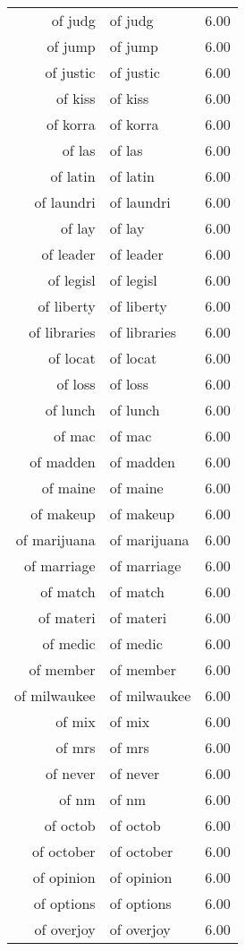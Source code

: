 \begin{table}[ht]
\begin{tabular}{rlr}
  of judg & of judg & 6.00 \\ 
  of jump & of jump & 6.00 \\ 
  of justic & of justic & 6.00 \\ 
  of kiss & of kiss & 6.00 \\ 
  of korra & of korra & 6.00 \\ 
  of las & of las & 6.00 \\ 
  of latin & of latin & 6.00 \\ 
  of laundri & of laundri & 6.00 \\ 
  of lay & of lay & 6.00 \\ 
  of leader & of leader & 6.00 \\ 
  of legisl & of legisl & 6.00 \\ 
  of liberty & of liberty & 6.00 \\ 
  of libraries & of libraries & 6.00 \\ 
  of locat & of locat & 6.00 \\ 
  of loss & of loss & 6.00 \\ 
  of lunch & of lunch & 6.00 \\ 
  of mac & of mac & 6.00 \\ 
  of madden & of madden & 6.00 \\ 
  of maine & of maine & 6.00 \\ 
  of makeup & of makeup & 6.00 \\ 
  of marijuana & of marijuana & 6.00 \\ 
  of marriage & of marriage & 6.00 \\ 
  of match & of match & 6.00 \\ 
  of materi & of materi & 6.00 \\ 
  of medic & of medic & 6.00 \\ 
  of member & of member & 6.00 \\ 
  of milwaukee & of milwaukee & 6.00 \\ 
  of mix & of mix & 6.00 \\ 
  of mrs & of mrs & 6.00 \\ 
  of never & of never & 6.00 \\ 
  of nm & of nm & 6.00 \\ 
  of octob & of octob & 6.00 \\ 
  of october & of october & 6.00 \\ 
  of opinion & of opinion & 6.00 \\ 
  of options & of options & 6.00 \\ 
  of overjoy & of overjoy & 6.00 \\ 

\end{tabular}
\end{table}
